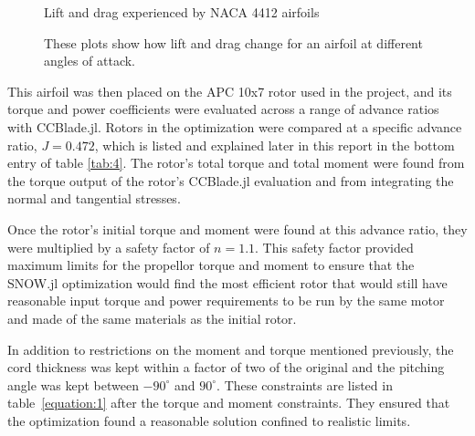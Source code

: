 \documentclass[journal ]{new-aiaa}
\begin{document}
\begin{figure}[H]
\centering
	\caption{Lift and drag experienced by NACA 4412 airfoils}
	\captionsetup{aboveskip=0pt,font=it}
	\caption*{These plots show how lift and drag change for an airfoil at different angles of attack.}
	\label{fig:8}
\end{figure}

This airfoil was then placed on the APC 10x7 rotor used in the project, and its torque and power coefficients were evaluated across a range of advance ratios with CCBlade.jl. Rotors in the optimization were compared at a specific advance ratio, $J=0.472$, which is listed and explained later in this report in the bottom entry of table \ref{tab:4}. The rotor's total torque and total moment were found from the torque output of the rotor's CCBlade.jl evaluation and from integrating the normal and tangential stresses.

Once the rotor's initial torque and moment were found at this advance ratio, they were multiplied by a safety factor of $n=1.1$. This safety factor provided maximum limits for the propellor torque and moment to ensure that the SNOW.jl optimization would find the most efficient rotor that would still have reasonable input torque and power requirements to be run by the same motor and made of the same materials as the initial rotor.

In addition to restrictions on the moment and torque mentioned previously, the cord thickness was kept within a factor of two of the original and the pitching angle was kept between $-90^{\circ}$ and $90^{\circ}$. These constraints are listed in table~\eqref{equation:1} after the torque and moment constraints. They ensured that the optimization found a reasonable solution confined to realistic limits.
\end{document}
